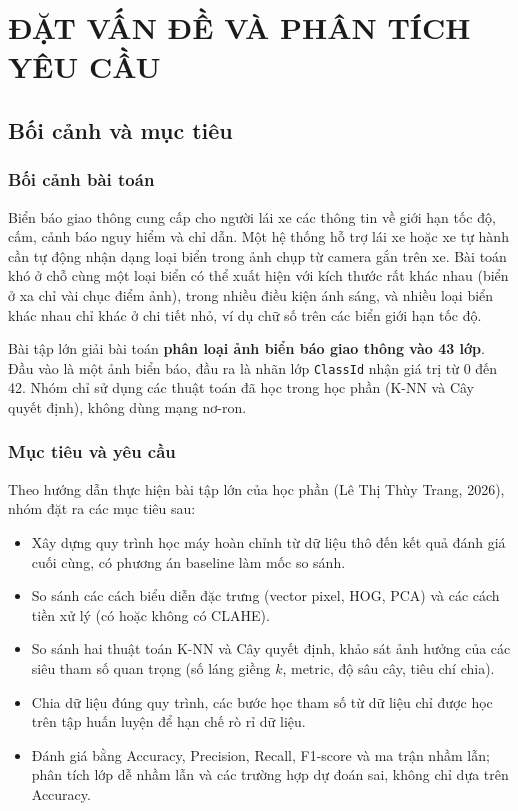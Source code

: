 \chapter{ĐẶT VẤN ĐỀ VÀ PHÂN TÍCH YÊU CẦU}

\section{Bối cảnh và mục tiêu}

\subsection{Bối cảnh bài toán}

Biển báo giao thông cung cấp cho người lái xe các thông tin về giới hạn tốc độ, cấm, cảnh báo nguy hiểm và chỉ dẫn. Một hệ thống hỗ trợ lái xe hoặc xe tự hành cần tự động nhận dạng loại biển trong ảnh chụp từ camera gắn trên xe. Bài toán khó ở chỗ cùng một loại biển có thể xuất hiện với kích thước rất khác nhau (biển ở xa chỉ vài chục điểm ảnh), trong nhiều điều kiện ánh sáng, và nhiều loại biển khác nhau chỉ khác ở chi tiết nhỏ, ví dụ chữ số trên các biển giới hạn tốc độ.

Bài tập lớn giải bài toán \textbf{phân loại ảnh biển báo giao thông vào 43 lớp}. Đầu vào là một ảnh biển báo, đầu ra là nhãn lớp \texttt{ClassId} nhận giá trị từ 0 đến 42. Nhóm chỉ sử dụng các thuật toán đã học trong học phần (K-NN và Cây quyết định), không dùng mạng nơ-ron.

\subsection{Mục tiêu và yêu cầu}

Theo hướng dẫn thực hiện bài tập lớn của học phần (Lê Thị Thùy Trang, 2026), nhóm đặt ra các mục tiêu sau:

\begin{itemize}
    \item Xây dựng quy trình học máy hoàn chỉnh từ dữ liệu thô đến kết quả đánh giá cuối cùng, có phương án baseline làm mốc so sánh.
    \item So sánh các cách biểu diễn đặc trưng (vector pixel, HOG, PCA) và các cách tiền xử lý (có hoặc không có CLAHE).
    \item So sánh hai thuật toán K-NN và Cây quyết định, khảo sát ảnh hưởng của các siêu tham số quan trọng (số láng giềng $k$, metric, độ sâu cây, tiêu chí chia).
    \item Chia dữ liệu đúng quy trình, các bước học tham số từ dữ liệu chỉ được học trên tập huấn luyện để hạn chế rò rỉ dữ liệu.
    \item Đánh giá bằng Accuracy, Precision, Recall, F1-score và ma trận nhầm lẫn; phân tích lớp dễ nhầm lẫn và các trường hợp dự đoán sai, không chỉ dựa trên Accuracy.
\end{itemize}

